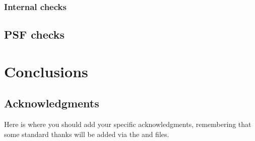 \documentclass[\docopts]{\docclass}
\begin{document}
\subsubsection{Internal checks}
\label{sec:internal_photometry}


\subsection{PSF checks}
\label{sec:psf_checks}


\section{Conclusions}
\label{sec:conclusions}



\subsection*{Acknowledgments}

Here is where you should add your specific acknowledgments, remembering that some standard thanks will be added
via the  and  files.







\end{document}

